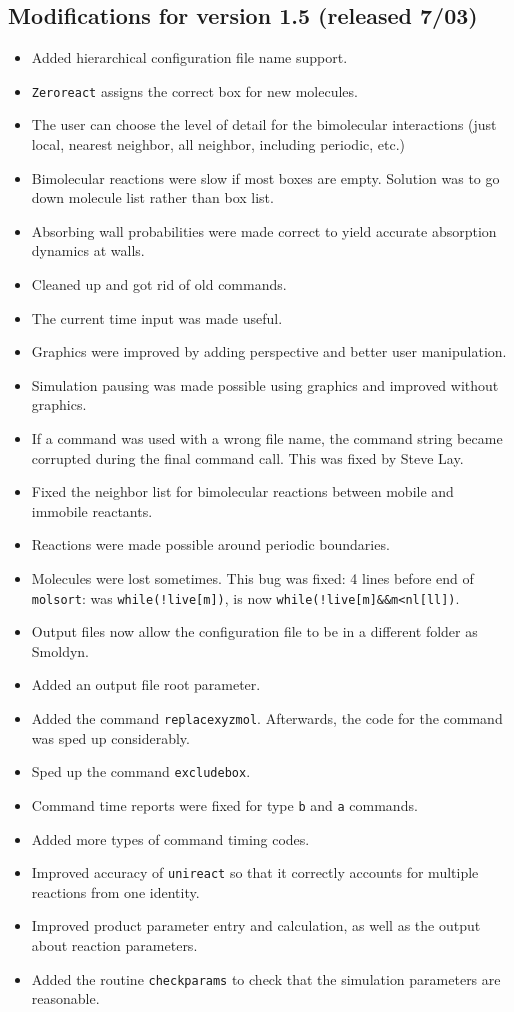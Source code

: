 \documentclass {book}
\begin{document}
\subsection*{Modifications for version 1.5 (released 7/03)}
\begin{itemize}
\item Added hierarchical configuration file name support.
\item \texttt{Zeroreact} assigns the correct box for new molecules.
\item The user can choose the level of detail for the bimolecular interactions (just local, nearest neighbor, all neighbor, including periodic, etc.)
\item Bimolecular reactions were slow if most boxes are empty. Solution was to go down molecule list rather than box list.
\item Absorbing wall probabilities were made correct to yield accurate absorption dynamics at walls.
\item Cleaned up and got rid of old commands.
\item The current time input was made useful.
\item Graphics were improved by adding perspective and better user manipulation.
\item Simulation pausing was made possible using graphics and improved without graphics.
\item If a command was used with a wrong file name, the command string became corrupted during the final command call. This was fixed by Steve Lay.
\item Fixed the neighbor list for bimolecular reactions between mobile and immobile reactants.
\item Reactions were made possible around periodic boundaries.
\item Molecules were lost sometimes. This bug was fixed: 4 lines before end of \texttt{molsort}: was \lstinline{while(!live[m])}, is now \lstinline{while(!live[m]&&m<nl[ll])}.
\item Output files now allow the configuration file to be in a different folder as Smoldyn.
\item Added an output file root parameter.
\item Added the command \texttt{replacexyzmol}. Afterwards, the code for the command was sped up considerably.
\item Sped up the command \texttt{excludebox}.
\item Command time reports were fixed for type \texttt{b} and \texttt{a} commands.
\item Added more types of command timing codes.
\item Improved accuracy of \texttt{unireact} so that it correctly accounts for multiple reactions from one identity.
\item Improved product parameter entry and calculation, as well as the output about reaction parameters.
\item Added the routine \texttt{checkparams} to check that the simulation parameters are reasonable.
\end{itemize}
\end{document}
